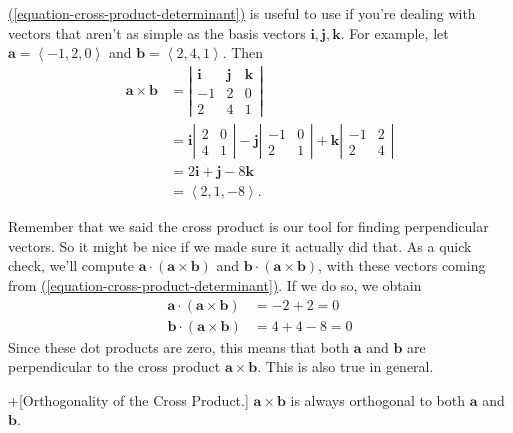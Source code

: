 \documentclass[10pt,]{book}
\theoremstyle{ptxplainnotitle}
\theoremstyle{ptxplaintitle}
\theoremstyle{ptxplainnotitle}
\theoremstyle{ptxplaintitle}
\theoremstyle{ptxplainnotitle}
\theoremstyle{ptxplaintitle}
\theoremstyle{ptxdefinitionnotitle}
\theoremstyle{ptxdefinitiontitle}
\theoremstyle{ptxdefinitionnotitle}
\theoremstyle{ptxdefinitiontitle}
\theoremstyle{ptxdefinitionnotitle}
\theoremstyle{ptxdefinitiontitle}
\theoremstyle{ptxdefinitionnotitle}
\theoremstyle{ptxdefinitiontitle}
\theoremstyle{ptxdefinitionnotitle}
\theoremstyle{ptxdefinitiontitle}
\numberwithin{equation}{section}
\newcommand{\vv}[1]{\mathbf{#1}}
\newcommand{\dotprod}[1]{\left\langle #1 \right\rangle}
\begin{document}
\begin{example}\label{example-another-cross-product}
\hypertarget{p-827}{}%
\hyperref[equation-cross-product-determinant]{(\ref{equation-cross-product-determinant})} is useful to use if you're dealing with vectors that aren't as simple as the basis vectors \(\vv{i},\vv{j},\vv{k}\). For example, let \(\vv{a} = \dotprod{-1,2,0}\) and \(\vv{b} = \dotprod{2,4,1}\). Then%
%
\begin{align*}
\vv{a}\times\vv{b} & = \left|\begin{array}{ccc}
\vv{i} & \vv{j} & \vv{k} \\
-1 & 2 & 0 \\
2 & 4 & 1 \end{array}\right| \\
& = \vv{i}\left|\begin{array}{cc} 2 & 0 \\ 4 & 1\end{array}\right| - \vv{j}\left|\begin{array}{cc} -1 & 0 \\ 2 & 1\end{array}\right| + \vv{k}\left|\begin{array}{cc} -1 & 2 \\ 2 & 4\end{array}\right|\\
& = 2\vv{i}+\vv{j}-8\vv{k}\\
& = \dotprod{2,1,-8}. 
\end{align*}
\end{example}
\hypertarget{p-828}{}%
Remember that we said the cross product is our tool for finding perpendicular vectors. So it might be nice if we made sure it actually did that. As a quick check, we'll compute \(\vv{a}\cdot(\vv{a}\times\vv{b})\) and \(\vv{b}\cdot(\vv{a}\times\vv{b})\), with these vectors coming from \hyperref[equation-cross-product-determinant]{(\ref{equation-cross-product-determinant})}. If we do so, we obtain%
%
\begin{align*}
\vv{a}\cdot(\vv{a}\times\vv{b}) & = -2 + 2 = 0 \\
\vv{b}\cdot(\vv{a}\times\vv{b}) & = 4 + 4 - 8 = 0 
\end{align*}
\hypertarget{p-829}{}%
Since these dot products are zero, this means that both \(\vv{a}\) and \(\vv{b}\) are perpendicular to the cross product \(\vv{a}\times\vv{b}\). This is also true in general.%
\begin{theorem}+[{Orthogonality of the Cross Product.}]\label{theorem-orthogonality-of-the-cross-product}
\hypertarget{p-830}{}%
\(\vv{a}\times\vv{b}\) is always orthogonal to both \(\vv{a}\) and \(\vv{b}\).%
\end{theorem}
\end{document}
